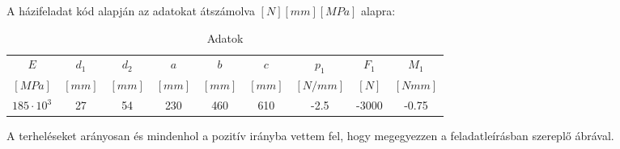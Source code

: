 \documentclass{article}
\begin{document}
	A házifeladat kód alapján az adatokat átszámolva $[N][mm][MPa]$ alapra:
	
	\begin{table}[h!]
		\begin{center}
			\caption{Adatok}
			\label{tab:table1}
			\begin{tabular}{c|c|c|c|c|c|c|c|c} %
				$E$ & $d_{1}$ & $d_{2}$ & $a$ & $b$ & $c$ & $p_{1}$ & $F_{1}$ & $M_{1}$ \\
				$[MPa]$ & $[mm]$ & $[mm]$ & $[mm]$ & $[mm]$ & $[mm]$ & $[N/mm]$ & $[N]$ & $[Nmm]$\\
				\hline
				$185\cdot10^3$ & 27 & 54 & 230 & 460 & 610 & -2.5 & -3000 & -0.75\\
			\end{tabular}
		\end{center}
	\end{table}
	
	\begin{flushleft}
		A terheléseket arányosan és mindenhol a pozitív irányba vettem fel, hogy megegyezzen a feladatleírásban szereplő ábrával.
	\end{flushleft}
	
	\newcommand{\degy}{8}
	\newcommand{\dketto}{16}
	
\end{document}
